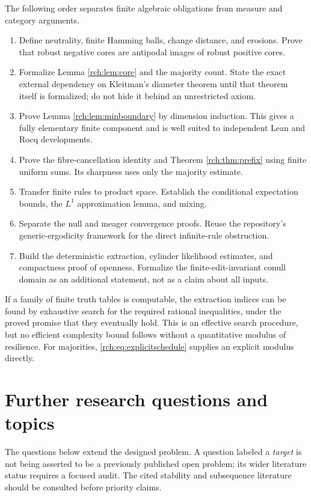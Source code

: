 \documentclass[11pt]{article}
\theoremstyle{definition}
\theoremstyle{remark}
\begin{document}
The following order separates finite algebraic obligations from measure and
category arguments.
\begin{enumerate}
\item Define neutrality, finite Hamming balls, change distance, and erosions.
Prove that robust negative cores are antipodal images of robust positive cores.
\item Formalize Lemma \ref{rch:lem:core} and the majority count. State the exact
external dependency on Kleitman's diameter theorem until that theorem itself
is formalized; do not hide it behind an unrestricted axiom.
\item Prove Lemma \ref{rch:lem:minboundary} by dimension induction. This gives a
fully elementary finite component and is well suited to independent Lean and
Rocq developments.
\item Prove the fibre-cancellation identity and Theorem \ref{rch:thm:prefix}
using finite uniform sums. Its sharpness uses only the majority estimate.
\item Transfer finite rules to product space. Establish the conditional
expectation bounds, the \(L^1\) approximation lemma, and mixing.
\item Separate the null and meager convergence proofs. Reuse the repository's
generic-ergodicity framework for the direct infinite-rule obstruction.
\item Build the deterministic extraction, cylinder likelihood estimates, and
compactness proof of openness. Formalize the finite-edit-invariant conull
domain as an additional statement, not as a claim about all inputs.
\end{enumerate}

If a family of finite truth tables is computable, the extraction indices can be
found by exhaustive search for the required rational inequalities, under the
proved promise that they eventually hold. This is an effective search procedure,
but no efficient complexity bound follows without a quantitative modulus of
resilience. For majorities, \eqref{rch:eq:explicitschedule} supplies an explicit
modulus directly.

\section{Further research questions and topics}
\label{rch:sec:questions}

The questions below extend the designed problem. A question labeled a
\emph{target} is not being asserted to be a previously published open problem;
its wider literature status requires a focused audit. The cited stability and
subsequence literature should be consulted before priority claims.
\end{document}

